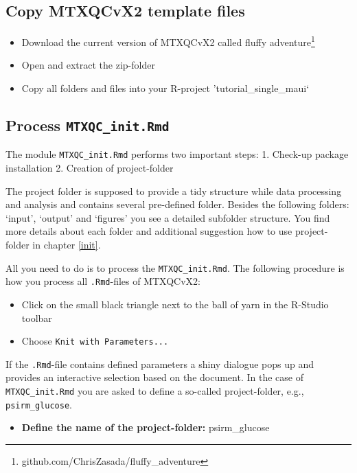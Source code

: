 \documentclass[]{book}
\providecommand{\tightlist}{%
  \setlength{\itemsep}{0pt}\setlength{\parskip}{0pt}}
\let\rmarkdownfootnote\footnote%
\def\footnote{\protect\rmarkdownfootnote}
\theoremstyle{definition}
\theoremstyle{definition}
\theoremstyle{definition}
\theoremstyle{remark}
\begin{document}
\subsection{Copy MTXQCvX2 template
files}\label{copy-mtxqcvx2-template-files}

\begin{itemize}
\tightlist
\item
  Download the current version of MTXQCvX2 called fluffy
  adventure\footnote{github.com/ChrisZasada/fluffy\_adventure}
\item
  Open and extract the zip-folder
\item
  Copy all folders and files into your R-project
  'tutorial\_single\_maui`
\end{itemize}

\subsection{\texorpdfstring{Process
\texttt{MTXQC\_init.Rmd}}{Process MTXQC\_init.Rmd}}\label{process-mtxqc_init.rmd}

The module \texttt{MTXQC\_init.Rmd} performs two important steps: 1.
Check-up package installation 2. Creation of project-folder

The project folder is supposed to provide a tidy structure while data
processing and analysis and contains several pre-defined folder. Besides
the following folders: `input', `output' and `figures' you see a
detailed subfolder structure. You find more details about each folder
and additional suggestion how to use project-folder in chapter
\ref{init}.

All you need to do is to process the \texttt{MTXQC\_init.Rmd}. The
following procedure is how you process all \texttt{.Rmd}-files of
MTXQCvX2:

\begin{itemize}
\tightlist
\item
  Click on the small black triangle next to the ball of yarn in the
  R-Studio toolbar
\item
  Choose \texttt{Knit\ with\ Parameters...}
\end{itemize}

If the \texttt{.Rmd}-file contains defined parameters a shiny dialogue
pops up and provides an interactive selection based on the document. In
the case of \texttt{MTXQC\_init.Rmd} you are asked to define a so-called
project-folder, e.g., \texttt{psirm\_glucose}.

\begin{itemize}
\tightlist
\item
  \textbf{Define the name of the project-folder:} psirm\_glucose
\end{itemize}
\end{document}
